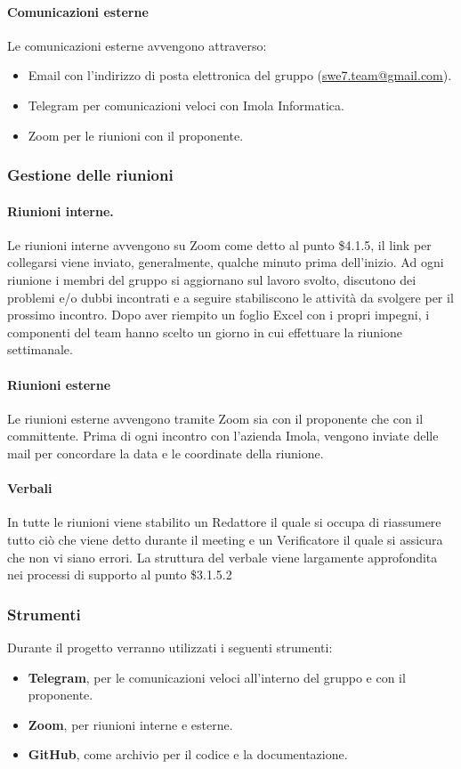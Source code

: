\paragraph{Comunicazioni esterne}
Le comunicazioni esterne avvengono attraverso:
\begin{itemize}
    \item Email con l'indirizzo di posta elettronica del gruppo (\href{mailto:swe7.team@gmail.com}{swe7.team@gmail.com}).
    \item Telegram per comunicazioni veloci con Imola Informatica.
    \item Zoom per le riunioni con il proponente.
\end{itemize}

\subsubsection{Gestione delle riunioni}
\paragraph{Riunioni interne.}
Le riunioni interne avvengono su Zoom come detto al punto \$4.1.5, il link per collegarsi viene inviato, generalmente, 
qualche minuto prima dell'inizio. Ad ogni riunione i membri del gruppo si aggiornano sul lavoro svolto, discutono dei problemi e/o dubbi incontrati 
e a seguire stabiliscono le attività da svolgere per il prossimo incontro. Dopo aver riempito un foglio Excel con i propri impegni, 
i componenti del team hanno scelto un giorno in cui effettuare la riunione settimanale.

\paragraph{Riunioni esterne}
Le riunioni esterne avvengono tramite Zoom sia con il proponente che con il committente. Prima di ogni incontro con 
l'azienda Imola, vengono inviate delle mail per concordare la data e le coordinate della riunione. 

\paragraph{Verbali}
In tutte le riunioni viene stabilito un Redattore il quale si occupa di riassumere tutto ciò che
viene detto durante il meeting e un Verificatore il quale si assicura che non vi siano errori. La struttura del verbale viene 
largamente approfondita nei processi di supporto al punto \$3.1.5.2

\subsubsection{Strumenti}
Durante il progetto verranno utilizzati i seguenti strumenti:
\begin{itemize}
    \item \textbf{Telegram}, per le comunicazioni veloci all'interno del gruppo e con il proponente.
    \item \textbf{Zoom}, per riunioni interne e esterne.
    \item \textbf{GitHub}, come archivio per il codice e la documentazione.
\end{itemize}